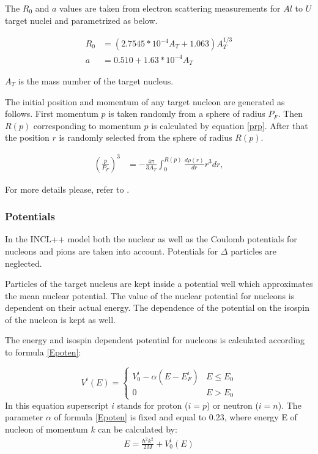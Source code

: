 The $R_{0}$ and $a$ values are taken from electron scattering measurements for $Al$ to $U$ target nuclei and parametrized as below. 

\begin{align}
	R_{0} &=(2.7545*10^{-4}A_{T}+1.063)A_{T}^{1/3}\\
	a &=0.510 + 1.63 *10^{-4}A_{T}
\end{align}

$A_T$ is the mass number of the target nucleus.

The initial position and momentum of any target nucleon are generated as follows. First momentum $p$ is taken randomly from a sphere of radius $P_{F}$. 
Then $R(p)$ corresponding to  momentum $p$ is calculated by equation \ref{prp}. After that the position $r$ is randomly selected from the sphere of radius $R(p)$.

\begin{align}
	\left(\frac{p}{P_{F}}\right)^{3}&=-\frac{4\pi}{3A_{T}}\int_{0}^{R(p)}\frac{d\rho(r)}{dr}r^{3}dr,\label{prp}
\end{align}

For more details please, refer to \cite{INCLboudard2002intranuclear}.

\subsubsection{Potentials}

In the INCL++ model both the nuclear as well as the Coulomb potentials for nucleons and pions are taken into account.
Potentials for $\Delta$ particles are neglected.

Particles of the target nucleus are kept inside a potential well which approximates the mean nuclear potential.
The value of the nuclear potential for nucleons is dependent on their actual energy. The dependence of the potential 
on the isospin of the nucleon is kept as well. 

The energy and isospin dependent potential for nucleons is calculated according to formula \ref{Epoten}:

\begin{equation}\label{Epoten}
	V^{i}(E)= \begin{cases} V_{0}^{i}-\alpha\left(E-E_F^{i}\right) &  E \leq E_{0} \\ 
		0 &  E > E_{0} \end{cases} 
\end{equation}
In this equation superscript $i$ stands for proton ($i=p$) or neutron ($i=n$).
The parameter $\alpha$ of formula \ref{Epoten} is fixed and equal to 0.23, where energy E of nucleon of momentum $k$ can be calculated by:
\begin{align}
	E=\frac{\hbar^2k^2}{2M}+V_{0}^{i}(E) \label{energy}
\end{align}

